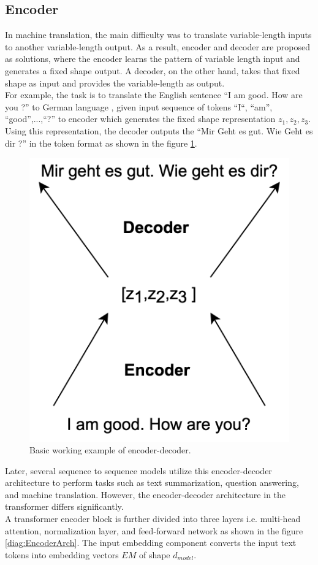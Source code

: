 \documentclass[%
	BCOR=8mm, %
	DIV=12,
	toc=bibliography, %
	toc=listof, %
	oneside, %
	egregdoesnotlikesansseriftitles, %
	]{scrbook}
\begin{document}
\subsection{Encoder}
In machine translation, the main difficulty was to translate variable-length inputs to another variable-length output. As a result, encoder and decoder are proposed as solutions, where the encoder learns the pattern of variable length input and generates a fixed shape output. A decoder, on the other hand, takes that fixed shape as input and provides the variable-length as output. \\
For example, the task is to translate the English sentence ``I am good. How are you ?'' to German language , given input sequence of tokens ``I``, ``am'', ``good'',...,``?'' to encoder which generates the fixed shape representation $z_{1},z_{2},z_{3}$. Using this representation, the decoder outputs the ``Mir Geht es gut. Wie Geht es dir ?'' in the token format as shown in the figure \ref{diag:EncoderDecoderExp}.\\
\begin{figure}[H]
    \centering
    \includegraphics[width=.30\textwidth]{img/EncoderDecoder2.png}
    \caption[Basic example of encoder-decoder working]{Basic working example of encoder-decoder.}
    \label{diag:EncoderDecoderExp}
\end{figure}
 Later, several sequence to sequence models utilize this encoder-decoder architecture to perform tasks such as text summarization, question answering, and machine translation. However, the encoder-decoder architecture in the transformer differs significantly.\\
A transformer encoder block is further divided into three layers i.e. multi-head attention, normalization layer, and feed-forward network as shown in the figure \ref{diag:EncoderArch}. The input embedding component converts the input text tokens into embedding vectors $EM$ of shape $d_{model}$.
\end{document}
